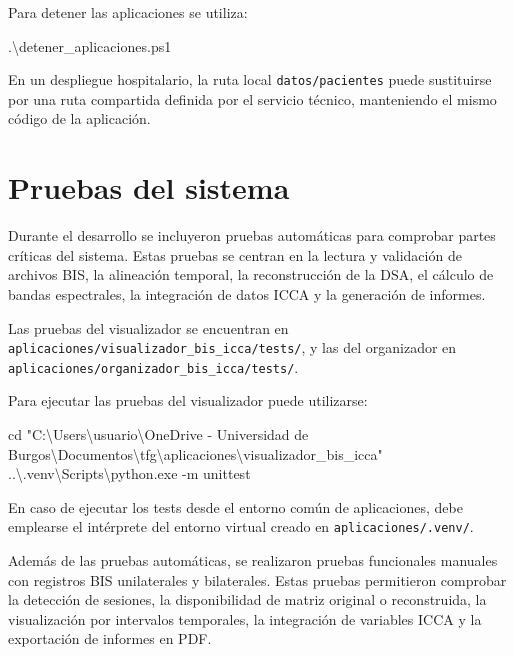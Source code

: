 \documentclass[
  spanish,
  a4paper,
  12pt,
  twoside]{memoir}
\newenvironment{Shaded}{\begin{snugshade}}{\end{snugshade}}
\newcommand{\FunctionTok}[1]{\textcolor[rgb]{0.28,0.35,0.67}{#1}}
\newcommand{\NormalTok}[1]{\textcolor[rgb]{0.00,0.23,0.31}{#1}}
\newcommand{\OperatorTok}[1]{\textcolor[rgb]{0.37,0.37,0.37}{#1}}
\newcommand{\StringTok}[1]{\textcolor[rgb]{0.13,0.47,0.30}{#1}}
\begin{document}
Para detener las aplicaciones se utiliza:

\begin{Shaded}
\begin{Highlighting}[]
\OperatorTok{.}\NormalTok{\textbackslash{}detener\_aplicaciones}\OperatorTok{.}\FunctionTok{ps1}
\end{Highlighting}
\end{Shaded}

En un despliegue hospitalario, la ruta local \texttt{datos/pacientes}
puede sustituirse por una ruta compartida definida por el servicio
técnico, manteniendo el mismo código de la aplicación.

\chapter{Pruebas del sistema}\label{pruebas-del-sistema}

Durante el desarrollo se incluyeron pruebas automáticas para comprobar
partes críticas del sistema. Estas pruebas se centran en la lectura y
validación de archivos BIS, la alineación temporal, la reconstrucción de
la DSA, el cálculo de bandas espectrales, la integración de datos ICCA y
la generación de informes.

Las pruebas del visualizador se encuentran en
\texttt{aplicaciones/visualizador\_bis\_icca/tests/}, y las del
organizador en \texttt{aplicaciones/organizador\_bis\_icca/tests/}.

Para ejecutar las pruebas del visualizador puede utilizarse:

\begin{Shaded}
\begin{Highlighting}[]
\FunctionTok{cd} \StringTok{"C:\textbackslash{}Users\textbackslash{}usuario\textbackslash{}OneDrive {-} Universidad de Burgos\textbackslash{}Documentos\textbackslash{}tfg\textbackslash{}aplicaciones\textbackslash{}visualizador\_bis\_icca"}
\OperatorTok{..}\NormalTok{\textbackslash{}}\OperatorTok{.}\FunctionTok{venv}\NormalTok{\textbackslash{}Scripts\textbackslash{}python}\OperatorTok{.}\FunctionTok{exe} \OperatorTok{{-}}\NormalTok{m unittest}
\end{Highlighting}
\end{Shaded}

En caso de ejecutar los tests desde el entorno común de aplicaciones,
debe emplearse el intérprete del entorno virtual creado en
\texttt{aplicaciones/.venv/}.

Además de las pruebas automáticas, se realizaron pruebas funcionales
manuales con registros BIS unilaterales y bilaterales. Estas pruebas
permitieron comprobar la detección de sesiones, la disponibilidad de
matriz original o reconstruida, la visualización por intervalos
temporales, la integración de variables ICCA y la exportación de
informes en PDF.
\end{document}
